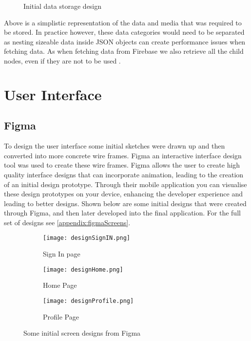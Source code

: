 \begin{figure}[!htbp]
    \centering
    \begin{subfigure}[b]{0.6\textwidth}
    \end{subfigure}
    \caption{Initial data storage design} 
    \label{fig:dataDesign}
\end{figure}
\FloatBarrier

Above is a simplistic representation of the data and media that was required to be stored.
In practice however, these data categories would need to be separated as nesting sizeable data inside JSON objects can create performance issues when fetching data. As when fetching data from Firebase we also retrieve all the child nodes, even if they are not to be used \cite{fbStructData}.

\section{User Interface}\label{UIDesign}
\subsection*{Figma}
To design the user interface some initial sketches were drawn up and then converted into more concrete wire frames. Figma \cite{figma} an interactive interface design tool was used to create these wire frames. Figma allows the user to create high quality interface designs that can incorporate animation, leading to the creation of an initial design prototype. Through their mobile application you can visualise these design prototypes on your device, enhancing the developer experience and leading to better designs. Shown below are some initial designs that were created through Figma, and then later developed into the final application. For the full set of designs see \ref{appendix:figmaScreens}.

\begin{figure}[!htbp]
    \centering
    \begin{subfigure}[b]{0.25\textwidth}
        \texttt{[image: designSignIN.png]}
        \caption{Sign In page}
    \end{subfigure}
    \hspace{1.5em}
    \begin{subfigure}[b]{0.25\textwidth}
        \texttt{[image: designHome.png]}
        \caption{Home Page}
    \end{subfigure}
    \hspace{1.5em}
    \begin{subfigure}[b]{0.25\textwidth}
        \texttt{[image: designProfile.png]}
        \caption{Profile Page}
    \end{subfigure}
    \caption{Some initial screen designs from Figma}
    \label{fig:figma}
\end{figure}
\FloatBarrier

